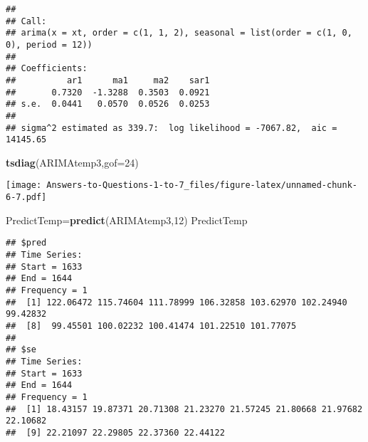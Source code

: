 \documentclass[
]{article}
\newenvironment{Shaded}{\begin{snugshade}}{\end{snugshade}}
\newcommand{\AttributeTok}[1]{\textcolor[rgb]{0.13,0.29,0.53}{#1}}
\newcommand{\DecValTok}[1]{\textcolor[rgb]{0.00,0.00,0.81}{#1}}
\newcommand{\FloatTok}[1]{\textcolor[rgb]{0.00,0.00,0.81}{#1}}
\newcommand{\FunctionTok}[1]{\textcolor[rgb]{0.13,0.29,0.53}{\textbf{#1}}}
\newcommand{\NormalTok}[1]{#1}
\newcommand{\OtherTok}[1]{\textcolor[rgb]{0.56,0.35,0.01}{#1}}
\newcommand{\SpecialCharTok}[1]{\textcolor[rgb]{0.81,0.36,0.00}{\textbf{#1}}}
\begin{document}
\begin{verbatim}
## 
## Call:
## arima(x = xt, order = c(1, 1, 2), seasonal = list(order = c(1, 0, 0), period = 12))
## 
## Coefficients:
##          ar1      ma1     ma2    sar1
##       0.7320  -1.3288  0.3503  0.0921
## s.e.  0.0441   0.0570  0.0526  0.0253
## 
## sigma^2 estimated as 339.7:  log likelihood = -7067.82,  aic = 14145.65
\end{verbatim}

\begin{Shaded}
\begin{Highlighting}[]
\FunctionTok{tsdiag}\NormalTok{(ARIMAtemp3,}\AttributeTok{gof=}\DecValTok{24}\NormalTok{)}
\end{Highlighting}
\end{Shaded}

\texttt{[image: Answers-to-Questions-1-to-7\_files/figure-latex/unnamed-chunk-6-7.pdf]}

\begin{Shaded}
\begin{Highlighting}[]
\NormalTok{PredictTemp}\OtherTok{=}\FunctionTok{predict}\NormalTok{(ARIMAtemp3,}\DecValTok{12}\NormalTok{)}
\NormalTok{PredictTemp}
\end{Highlighting}
\end{Shaded}

\begin{verbatim}
## $pred
## Time Series:
## Start = 1633 
## End = 1644 
## Frequency = 1 
##  [1] 122.06472 115.74604 111.78999 106.32858 103.62970 102.24940  99.42832
##  [8]  99.45501 100.02232 100.41474 101.22510 101.77075
## 
## $se
## Time Series:
## Start = 1633 
## End = 1644 
## Frequency = 1 
##  [1] 18.43157 19.87371 20.71308 21.23270 21.57245 21.80668 21.97682 22.10682
##  [9] 22.21097 22.29805 22.37360 22.44122
\end{verbatim}

\begin{Shaded}
\end{Shaded}
\end{document}
